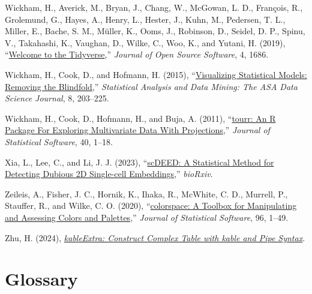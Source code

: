 \documentclass[
  11pt,
  a4paper,
]{report}
\newlength{\cslhangindent}
\newenvironment{CSLReferences}[2] %
 {\begin{list}{}{%
  \setlength{\itemindent}{0pt}
  \setlength{\leftmargin}{0pt}
  \setlength{\parsep}{0pt}
  \ifodd #1
   \setlength{\leftmargin}{\cslhangindent}
   \setlength{\itemindent}{-1\cslhangindent}
  \fi
  \setlength{\itemsep}{#2\baselineskip}}}
 {\end{list}}
\begin{document}
\begin{CSLReferences}{1}{0}
Wickham, H., Averick, M., Bryan, J., Chang, W., McGowan, L. D.,
François, R., Grolemund, G., Hayes, A., Henry, L., Hester, J., Kuhn, M.,
Pedersen, T. L., Miller, E., Bache, S. M., Müller, K., Ooms, J.,
Robinson, D., Seidel, D. P., Spinu, V., Takahashi, K., Vaughan, D.,
Wilke, C., Woo, K., and Yutani, H. (2019),
{``\href{/url\%7Bhttps://doi.org/10.21105/joss.01686\%7D.}{{Welcome to
the Tidyverse}},''} \emph{Journal of Open Source Software}, 4, 1686.

Wickham, H., Cook, D., and Hofmann, H. (2015),
{``\href{/url\%7Bhttps://onlinelibrary.wiley.com/doi/abs/10.1002/sam.11271\%7D.}{{Visualizing
Statistical Models: Removing the Blindfold}},''} \emph{Statistical
Analysis and Data Mining: The ASA Data Science Journal}, 8, 203--225.

Wickham, H., Cook, D., Hofmann, H., and Buja, A. (2011),
{``\href{/url\%7Bhttp://www.jstatsoft.org/v40/i02/\%7D.}{{tourr: An R
Package For Exploring Multivariate Data With Projections}},''}
\emph{Journal of Statistical Software}, 40, 1--18.

Xia, L., Lee, C., and Li, J. J. (2023),
{``\href{/url\%7Bhttps://www.biorxiv.org/content/early/2023/04/25/2023.04.21.537839\%7D.}{{scDEED:
A Statistical Method for Detecting Dubious 2D Single-cell
Embeddings}},''} \emph{bioRxiv}.

Zeileis, A., Fisher, J. C., Hornik, K., Ihaka, R., McWhite, C. D.,
Murrell, P., Stauffer, R., and Wilke, C. O. (2020),
{``\href{/url\%7Bhttps://www.jstatsoft.org/index.php/jss/article/view/v096i01\%7D.}{{colorspace:
A Toolbox for Manipulating and Assessing Colors and Palettes}},''}
\emph{Journal of Statistical Software}, 96, 1--49.

Zhu, H. (2024),
\emph{\href{/url\%7Bhttps://CRAN.R-project.org/package=kableExtra\%7D.}{{kableExtra:
Construct Complex Table with kable and Pipe Syntax}}}.

\end{CSLReferences}

\cleardoublepage
{}
{}
\appendix

\chapter{Glossary}\label{glossary}
\end{document}
